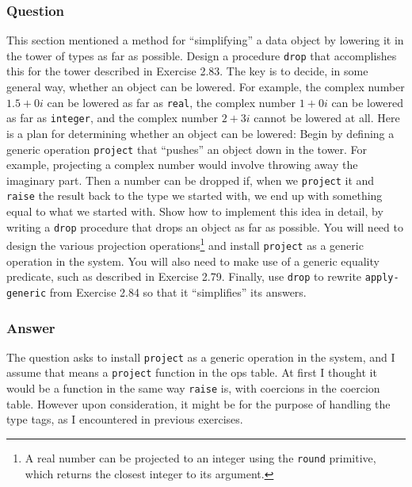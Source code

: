 \documentclass[final,fleqn,titlepage,twoside]{article}
\begin{document}
\subsubsection{Question}
\label{sec:orga8420f5}
This section mentioned a method for ``simplifying'' a data object by lowering it
in the tower of types as far as possible. Design a procedure \texttt{drop}
that accomplishes this for the tower described in Exercise 2.83. The key is to
decide, in some general way, whether an object can be lowered. For example, the
complex number \(1.5 + 0i\) can be lowered as far as \texttt{real}, the
complex number \(1 + 0i\) can be lowered as far as \texttt{integer}, and the
complex number \(2 + 3i\) cannot be lowered at all. Here is a plan for
determining whether an object can be lowered: Begin by defining a generic
operation \texttt{project} that ``pushes'' an object down in the tower. For
example, projecting a complex number would involve throwing away the imaginary
part. Then a number can be dropped if, when we \texttt{project} it and
\texttt{raise} the result back to the type we started with, we end up with
something equal to what we started with. Show how to implement this idea in
detail, by writing a \texttt{drop} procedure that drops an object as far as
possible. You will need to design the various projection operations\footnote{A real
number can be projected to an integer using the \texttt{round} primitive,
which returns the closest integer to its argument.} and install
\texttt{project} as a generic operation in the system. You will also need to
make use of a generic equality predicate, such as described in Exercise 2.79.
Finally, use \texttt{drop} to rewrite \texttt{apply-generic} from Exercise
2.84 so that it ``simplifies'' its answers.

\subsubsection{Answer}
\label{sec:org60744a7}
The question asks to install \texttt{project} as a generic operation in the system, and
I assume that means a \texttt{project} function in the ops table. At first I thought it
would be a function in the same way \texttt{raise} is, with coercions in the coercion
table. However upon consideration, it might be for the purpose of handling the type tags, as I encountered in previous exercises.
\end{document}
